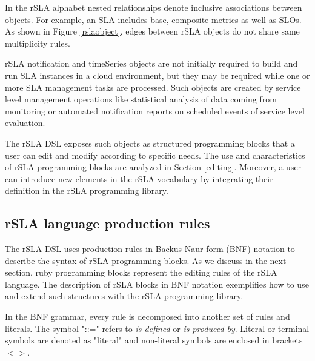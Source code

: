 In the rSLA alphabet nested relationships denote inclusive associations between objects. For example, an SLA includes base, composite metrics as well as SLOs. As shown in Figure \ref{rslaobject}, edges between  rSLA objects do not share same multiplicity rules. 

rSLA notification and timeSeries objects are not initially required to build and run SLA instances in a cloud environment, but they may be required while one or more SLA management tasks are processed. Such objects are created by service level management operations like statistical analysis of data coming from monitoring or automated notification reports on scheduled events of service level evaluation. 

The rSLA DSL exposes such objects as structured programming blocks that a user can edit and modify according to specific needs. The use and characteristics of rSLA programming blocks are analyzed in Section \ref{editing}. Moreover, a user can introduce new elements in the rSLA vocabulary by integrating their definition in the rSLA programming library. 

\subsection{rSLA language production rules}

The rSLA DSL uses production rules in Backus-Naur form (BNF) notation to describe the syntax of rSLA programming blocks. As we discuss in the next section, ruby programming blocks represent the editing rules of the rSLA language. The description of rSLA blocks in BNF notation exemplifies how to use and extend such structures with the rSLA programming library.

In the BNF grammar, every rule is decomposed into another set of rules and literals. The symbol "::=" refers to \textit{is defined} or \textit{is produced by}. Literal or terminal symbols are denoted as "literal" and non-literal symbols are enclosed in brackets $<>$.

